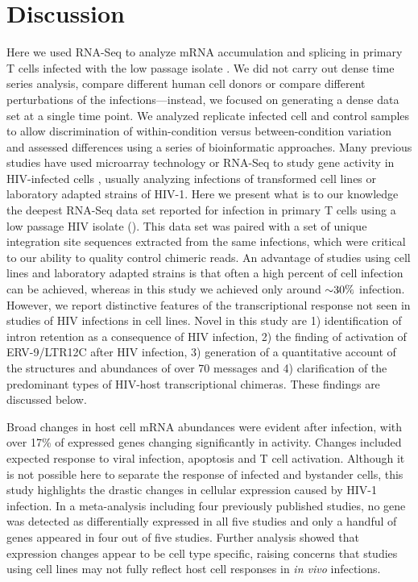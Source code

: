 \documentclass[../sherrill-Mix_thesis.tex]{subfiles}
\begin{document}
\section{Discussion}
	Here we used RNA-Seq to analyze mRNA accumulation and splicing in primary T cells infected with the low passage isolate \hivEight{}.  We did not carry out dense time series analysis, compare different human cell donors or compare different perturbations of the infections---instead, we focused on generating a dense data set at a single time point.  We analyzed replicate infected cell and control samples to allow discrimination of within-condition versus between-condition variation and assessed differences using a series of bioinformatic approaches. Many previous studies have used microarray technology or RNA-Seq to study gene activity in HIV-infected cells \citep{Corbeil2001,delaFuente2002,Mitchell2003,Woelk2004,Hyrcza2007,Wu2008,Smith2010,Chang2011,Lefebvre2011,Imbeault2012,Mohammadi2013,Peng2014}, usually analyzing infections of transformed cell lines or laboratory adapted strains of HIV-1. Here we present what is to our knowledge the deepest RNA-Seq data set reported for infection in primary T cells using a low passage HIV isolate (\hivEight{}). This data set was paired with a set of \nIntegrations{} unique integration site sequences extracted from the same infections, which were critical to our ability to quality control chimeric reads. An advantage of studies using cell lines and laboratory adapted strains is that often a high percent of cell infection can be achieved, whereas in this study we achieved only around $\mathord{\sim}30\%$ infection.  However, we report distinctive features of the transcriptional response not seen in studies of HIV infections in cell lines.  Novel in this study are 1) identification of intron retention as a consequence of HIV infection, 2) the finding of activation of ERV-9/LTR12C after HIV infection,  3) generation of a quantitative account of the structures and abundances of over 70 \hivEight{} messages and 4) clarification of the predominant types of HIV-host transcriptional chimeras.  These findings are discussed below.

	Broad changes in host cell mRNA abundances were evident after infection, with over 17\% of expressed genes changing significantly in activity. Changes included expected response to viral infection, apoptosis and T cell activation. Although it is not possible here to separate the response of infected and bystander cells, this study highlights the drastic changes in cellular expression caused by HIV-1 infection. In a meta-analysis including four previously published studies, no gene was detected as differentially expressed in all five studies and only a handful of genes appeared in four out of five studies. Further analysis showed that expression changes appear to be cell type specific, raising concerns that studies using cell lines may not fully reflect host cell responses in \emph{in vivo} infections. 
\end{document}
